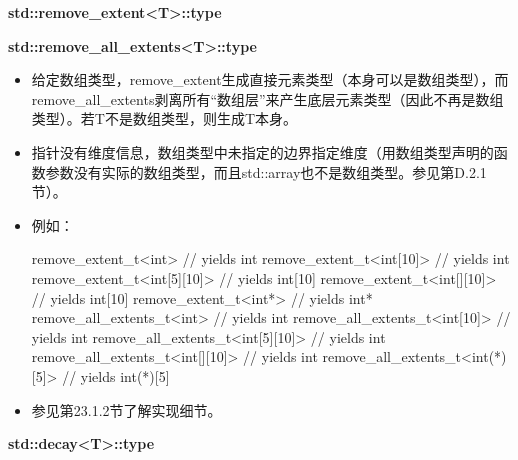\textbf{std::remove\_extent<T>::type}

\textbf{std::remove\_all\_extents<T>::type}

\begin{itemize}
\item
给定数组类型，remove\_extent生成直接元素类型（本身可以是数组类型），而remove\_all\_extents剥离所有“数组层”来产生底层元素类型（因此不再是数组类型）。若T不是数组类型，则生成T本身。

\item
指针没有维度信息，数组类型中未指定的边界指定维度（用数组类型声明的函数参数没有实际的数组类型，而且std::array也不是数组类型。参见第D.2.1节）。

\item
例如：
\begin{cpp}
remove_extent_t<int> // yields int
remove_extent_t<int[10]> // yields int
remove_extent_t<int[5][10]> // yields int[10]
remove_extent_t<int[][10]> // yields int[10]
remove_extent_t<int*> // yields int*
remove_all_extents_t<int> // yields int
remove_all_extents_t<int[10]> // yields int
remove_all_extents_t<int[5][10]> // yields int
remove_all_extents_t<int[][10]> // yields int
remove_all_extents_t<int(*)[5]> // yields int(*)[5]
\end{cpp}

\item
参见第23.1.2节了解实现细节。
\end{itemize}

\textbf{std::decay<T>::type}

